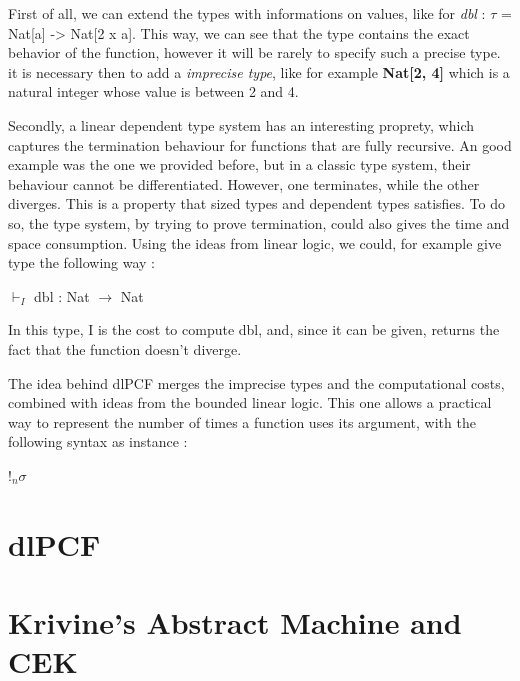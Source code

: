 \documentclass[a4paper,12pt]{report}
\begin{document}
First of all, we can extend the types with informations on values, like for
\emph{dbl} : $\tau$ = Nat[a] -> Nat[2 x a]. This way, we can see that the type
contains the exact behavior of the function, however it will be rarely to
specify such a precise type. it is necessary then to add a \emph{imprecise
  type}, like for example \textbf{Nat[2, 4]} which is a natural integer whose
value is between 2 and 4.

\medskip

Secondly, a linear dependent type system has an interesting proprety, which
captures the termination behaviour for functions that are fully recursive. An
good example was the one we provided before, but in a classic type system, their
behaviour cannot be differentiated. However, one terminates, while the other
diverges. This is a property that sized types and dependent types satisfies. To
do so, the type system, by trying to prove termination, could also gives the
time and space consumption. Using the ideas from linear logic, we could, for
example give type the following way :

\begin{center}
$\vdash_{I}$ dbl : Nat $\rightarrow$ Nat
\end{center}

In this type, I is the cost to compute dbl, and, since it can be given, returns
the fact that the function doesn't diverge.

The idea behind dlPCF merges the imprecise types and the computational costs,
combined with ideas from the bounded linear logic. This one allows a practical
way to represent the number of times a function uses its argument, with the
following syntax as instance :

\begin{center}
!$_{n}\sigma$
\end{center} 

\section{dlPCF}

\section{Krivine's Abstract Machine and CEK}
\end{document}
